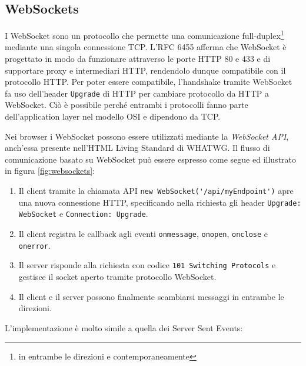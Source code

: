 \documentclass[12pt,a4paper,openright,twoside]{report}
\begin{document}
\subsection{WebSockets}
I WebSocket sono un protocollo che permette una comunicazione full-duplex\footnote{in entrambe le direzioni e contemporaneamente} mediante una singola connessione TCP.
L'RFC 6455 afferma che WebSocket è progettato in modo da funzionare attraverso le porte HTTP 80 e 433 e di supportare proxy e intermediari HTTP, rendendolo dunque compatibile con il protocollo HTTP\cite{websockets_rfc}. Per poter essere compatibile, l'handshake tramite WebSocket fa uso dell'header \lstinline{Upgrade} di HTTP per cambiare protocollo da HTTP a WebSocket. Ciò è possibile perché entrambi i protocolli fanno parte dell'application layer nel modello OSI e dipendono da TCP.

\bigskip

Nei browser i WebSocket possono essere utilizzati mediante la \textit{WebSocket API}, anch'essa presente nell'HTML Living Standard di WHATWG.
Il flusso di comunicazione basato su WebSocket può essere espresso come segue\cite{websockets} ed illustrato in figura \ref{fig:websockets}:
\begin{enumerate}
  \item Il client tramite la chiamata API \lstinline{new WebSocket('/api/myEndpoint')} apre una nuova connessione HTTP, specificando nella richiesta gli header \lstinline{Upgrade: WebSocket} e \lstinline{Connection: Upgrade}.
  \item Il client registra le callback agli eventi \lstinline{onmessage}, \lstinline{onopen}, \lstinline{onclose} e \lstinline{onerror}.
  \item Il server risponde alla richiesta con codice \lstinline{101 Switching Protocols} e gestisce il socket aperto tramite protocollo WebSocket.
  \item Il client e il server possono finalmente scambiarsi messaggi in entrambe le direzioni.
\end{enumerate}
L'implementazione è molto simile a quella dei Server Sent Events:

\end{document}

